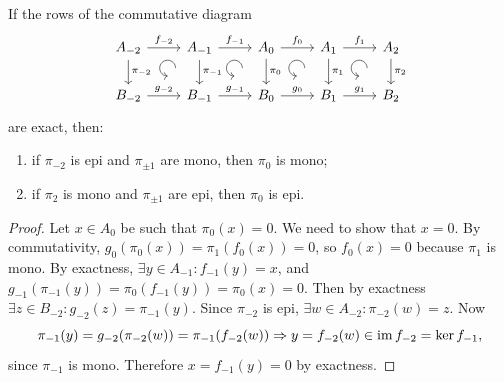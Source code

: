 \begin{lem}[5-lemma]\label{5-lemma}
    If the rows of the commutative diagram
    \[\begin{tikzcd}[every matrix/.append style={name=m},   
        execute at end picture={\draw [<-] ([xshift=-8mm,yshift=-10mm]m-1-2.north) arc[start angle=-90,delta angle=-270,radius=0.2cm];
        \draw [<-] ([xshift=-8mm,yshift=-10mm]m-1-3.north) arc[start angle=-90,delta angle=-270,radius=0.2cm];
        \draw [<-] ([xshift=-8mm,yshift=-10mm]m-1-4.north) arc[start angle=-90,delta angle=-270,radius=0.2cm];
        \draw [<-] ([xshift=-8mm,yshift=-10mm]m-1-5.north) arc[start angle=-90,delta angle=-270,radius=0.2cm];}]
        A_{-2}\arrow[r,"f_{-2}"]\arrow[d,"\pi_{-2}"] & A_{-1}\arrow[r,"f_{-1}"]\arrow[d,"\pi_{-1}"] & A_0 \arrow[r,"f_0"]\arrow[d,"\pi_0"] & A_1\arrow[d,"\pi_1"]\arrow[r,"f_1"] & A_2\arrow[d,"\pi_2"] \\
       B_{-2}\arrow[r,"g_{-2}"] & B_{-1}\arrow[r,"g_{-1}"] & B_0\arrow[r,"g_0"] &B_1 \arrow[r,"g_1"] &B_2 
    \end{tikzcd}\]
    are exact, then:
    \begin{enumerate}
        \item if $\pi_{-2}$ is epi and $\pi_{\pm 1}$ are mono, then $\pi_0$ is mono;
        \item if $\pi_2$ is mono and $\pi_{\pm 1}$ are epi, then $\pi_0$ is epi.
    \end{enumerate}
\end{lem}
\begin{proof}
    Let $x\in A_0$ be such that $\pi_0(x)=0$. We need to show that $x=0$. By commutativity, $g_0(\pi_0(x))=\pi_1(f_0(x))=0$, so $f_0(x)=0$ because $\pi_1$ is mono. By exactness, $\exists y\in A_{-1}:f_{-1}(y)=x$, and $g_{-1}(\pi_{-1}(y))=\pi_0(f_{-1}(y))=\pi_0(x)=0$. Then by exactness $\exists z\in B_{-2}:g_{-2}(z)=\pi_{-1}(y)$. Since $\pi_{-2}$ is epi, $\exists w\in A_{-2}:\pi_{-2}(w)=z$. Now 
    \[\pi_{-1}(y)=g_{-2}(\pi_{-2}(w))=\pi_{-1}(f_{-2}(w))\Rightarrow y=f_{-2}(w)\in\operatorname{im} f_{-2}=\ker f_{-1},\]
    since $\pi_{-1}$ is mono. Therefore $x=f_{-1}(y)=0$ by exactness.
\end{proof}
